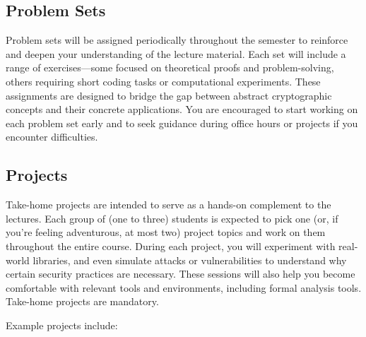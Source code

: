 \documentclass[10pt,a4paper,american]{exam}
\begin{document}
\subsection{Problem Sets}
Problem sets will be assigned periodically throughout the semester to reinforce and deepen your understanding of the lecture material. Each set will include a range of exercises—some focused on theoretical proofs and problem-solving, others requiring short coding tasks or computational experiments. These assignments are designed to bridge the gap between abstract cryptographic concepts and their concrete applications. You are encouraged to start working on each problem set early and to seek guidance during office hours or projects if you encounter difficulties.

\subsection{Projects}
Take-home projects are intended to serve as a hands-on complement to the lectures. Each group of (one to three) students is expected to pick one (or, if you're feeling adventurous, at most two) project topics and work on them throughout the entire course. During each project, you will experiment with real-world libraries, and even simulate attacks or vulnerabilities to understand why certain security practices are necessary. These sessions will also help you become comfortable with relevant tools and environments, including formal analysis tools. Take-home projects are mandatory.

Example projects include:
\end{document}
